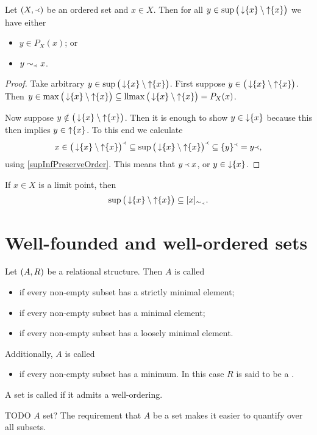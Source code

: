 \begin{lemma}
Let $\sSet{X,\Yleft}$ be an ordered set and $x\in X$. Then for all $y\in \sup\big(\operatorname{\downarrow}\{x\}\setminus \operatorname{\uparrow}\{x\}\big)$ we have either
\begin{itemize}
\item $y\in P_X(x)$; or
\item $y\sim_\Yleft x$.
\end{itemize}
\end{lemma}
\begin{proof}
Take arbitrary $y\in \sup\big(\operatorname{\downarrow}\{x\}\setminus \operatorname{\uparrow}\{x\}\big)$. First suppose $y\in\big(\operatorname{\downarrow}\{x\}\setminus \operatorname{\uparrow}\{x\}\big)$. Then $y\in \max\big(\operatorname{\downarrow}\{x\}\setminus \operatorname{\uparrow}\{x\}\big) \subseteq \operatorname{llmax}\big(\operatorname{\downarrow}\{x\}\setminus \operatorname{\uparrow}\{x\}\big) = P_X(x)$.


Now suppose $y\notin\big(\operatorname{\downarrow}\{x\}\setminus \operatorname{\uparrow}\{x\}\big)$. Then it is enough to show $y\in \operatorname{\downarrow}\{x\}$ because this then implies $y\in \operatorname{\uparrow}\{x\}$. To this end we calculate
\[ x\in \big(\operatorname{\downarrow}\{x\}\setminus \operatorname{\uparrow}\{x\}\big)^\Yleft \subseteq \sup\big(\operatorname{\downarrow}\{x\}\setminus \operatorname{\uparrow}\{x\}\big)^\Yleft \subseteq \{y\}^\Yleft = y{\Yleft}, \]
using \ref{supInfPreserveOrder}. This means that $y \Yleft x$, or $y\in \operatorname{\downarrow}\{x\}$.
\end{proof}
\begin{corollary} \label{supLesserElementsOfLimitPoint}
If $x\in X$ is a limit point, then
\[ \sup\big(\operatorname{\downarrow}\{x\}\setminus \operatorname{\uparrow}\{x\}\big) \subseteq [x]_{\sim_\Yleft}. \]
\end{corollary}


\section{Well-founded and well-ordered sets}
\begin{definition}
Let $\sSet{A,R}$ be a relational structure.
Then $A$ is called
\begin{itemize}
\item {} if every non-empty subset has a strictly minimal element;
\item {} if every non-empty subset has a minimal element;
\item {} if every non-empty subset has a loosely minimal element.
\end{itemize}
Additionally, $A$ is called
\begin{itemize}
\item {} if every non-empty subset has a minimum. In this case $R$ is said to be a .
\end{itemize}
A set is called  if it admits a well-ordering.
\end{definition}
TODO $A$ set? The requirement that $A$ be a set makes it easier to quantify over all subsets.

